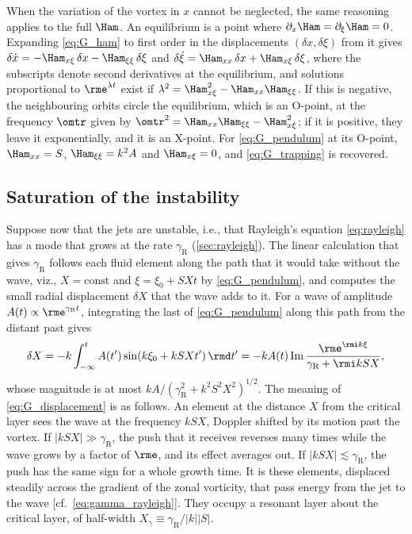 When the variation of the vortex in \(x\) cannot be neglected, the same reasoning applies to the full \(\Ham\). An equilibrium is a point where \(\partial_x\Ham = \partial_\xi\Ham = 0\). Expanding \cref{eq:G_ham} to first order in the displacements \((\delta x, \delta\xi)\) from it gives \(\delta\dot x = -\Ham_{x\xi}\,\delta x - \Ham_{\xi\xi}\,\delta\xi\) and \(\delta\dot\xi = \Ham_{xx}\,\delta x + \Ham_{x\xi}\,\delta\xi\), where the subscripts denote second derivatives at the equilibrium, and solutions proportional to \(\rme^{\lambda t}\) exist if \(\lambda^2 = \Ham_{x\xi}^2 - \Ham_{xx}\Ham_{\xi\xi}\). If this is negative, the neighbouring orbits circle the equilibrium, which is an O-point, at the frequency \(\omtr\) given by \(\omtr^2 = \Ham_{xx}\Ham_{\xi\xi} - \Ham_{x\xi}^2\); if it is positive, they leave it exponentially, and it is an X-point. For \cref{eq:G_pendulum} at its O-point, \(\Ham_{xx} = S\), \(\Ham_{\xi\xi} = k^2A\) and \(\Ham_{x\xi} = 0\), and \cref{eq:G_trapping} is recovered.

\subsection{Saturation of the instability}\label{app:trapping_saturation}

Suppose now that the jets are unstable, i.e., that Rayleigh's equation \cref{eq:rayleigh} has a mode that grows at the rate \(\gamma_\text{R}\) (\cref{sec:rayleigh}). The linear calculation that gives \(\gamma_\text{R}\) follows each fluid element along the path that it would take without the wave, viz., \(X = \text{const}\) and \(\xi = \xi_0 + SXt\) by \cref{eq:G_pendulum}, and computes the small radial displacement \(\delta X\) that the wave adds to it. For a wave of amplitude \(A(t)\propto\rme^{\gamma_\text{R}t}\), integrating the last of \cref{eq:G_pendulum} along this path from the distant past gives
\begin{equation}
\delta X = -k\int_{-\infty}^{t}A(t')\sin\!\left(k\xi_0 + kSXt'\right)\rmd t'
= -kA(t)\operatorname{Im}\frac{\rme^{\rmi k\xi}}{\gamma_\text{R} + \rmi kSX},
\label{eq:G_displacement}
\end{equation}
whose magnitude is at most \(kA/(\gamma_\text{R}^2 + k^2S^2X^2)^{1/2}\). The meaning of \cref{eq:G_displacement} is as follows. An element at the distance \(X\) from the critical layer sees the wave at the frequency \(kSX\), Doppler shifted by its motion past the vortex. If \(|kSX|\gg\gamma_\text{R}\), the push that it receives reverses many times while the wave grows by a factor of \(\rme\), and its effect averages out. If \(|kSX|\lesssim\gamma_\text{R}\), the push has the same sign for a whole growth time. It is these elements, displaced steadily across the gradient of the zonal vorticity, that pass energy from the jet to the wave [cf.\ \cref{eq:gamma_rayleigh}]. They occupy a resonant layer about the critical layer, of half-width \(X_\gamma \equiv \gamma_\text{R}/|k||S|\).


